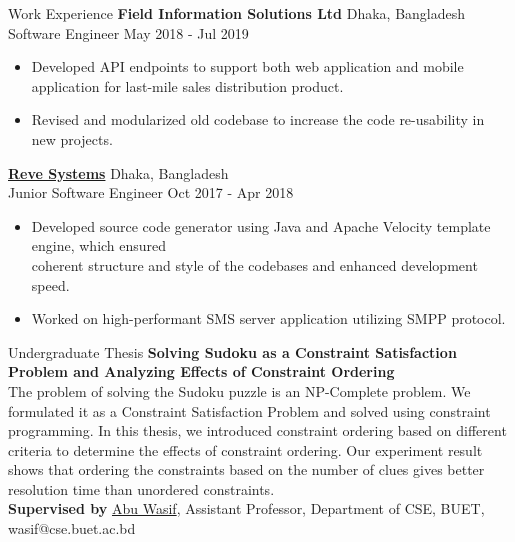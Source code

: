 \documentclass[12pt]{resume} %
\begin{document}
\begin{rSection}{Work Experience}
{\bf Field Information Solutions Ltd} \hfill  Dhaka, Bangladesh \\
Software Engineer \hfill May 2018 - Jul 2019
 \begin{itemize}
    \itemsep -3pt {} 
     \item Developed API endpoints to support both web application and mobile application for last-mile sales distribution product.
     \item Revised and modularized old codebase to increase the code re-usability in new projects.
 \end{itemize}

{\bf \href{https://www.revesoft.com/}{Reve Systems} } \hfill Dhaka, Bangladesh \\
Junior Software Engineer \hfill Oct 2017 - Apr 2018 
\begin{itemize}
    \itemsep -3pt {} 
     \item Developed source code generator using Java and Apache Velocity template engine, which ensured\\
     coherent structure and style of the codebases and enhanced development speed.
     \item Worked on high-performant SMS server application utilizing SMPP protocol.
 \end{itemize}
 
\end{rSection} 



\newpage
\begin{rSection}{Undergraduate Thesis}
{\bf Solving Sudoku as a Constraint Satisfaction Problem and Analyzing Effects of Constraint Ordering} \\
The problem of solving the Sudoku puzzle is an NP-Complete problem. We formulated it as a Constraint Satisfaction Problem and solved using constraint programming. In this thesis, we introduced constraint ordering based on different criteria to determine the effects of constraint ordering. Our experiment result shows that ordering the constraints based on the number of clues gives better resolution time than unordered constraints.  \\
\textbf{Supervised by} \href{https://cse.buet.ac.bd/faculty/facdetail.php?id=wasif}{Abu Wasif}, Assistant Professor, Department of CSE, BUET, wasif@cse.buet.ac.bd

\end{rSection}
\end{document}
